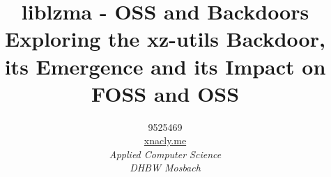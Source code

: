 

\title{liblzma - OSS and Backdoors\\\large Exploring the xz-utils
Backdoor, its Emergence and its Impact on FOSS and OSS}
\author{9525469\\\href{https://xnacly.me}{xnacly.me}\\\small\textit{Applied Computer Science}\\\small\textit{DHBW Mosbach}}


    \maketitle
    
    \cite{ccc2024backdoor} 
    
    
    
    
    \printbibliography

    


